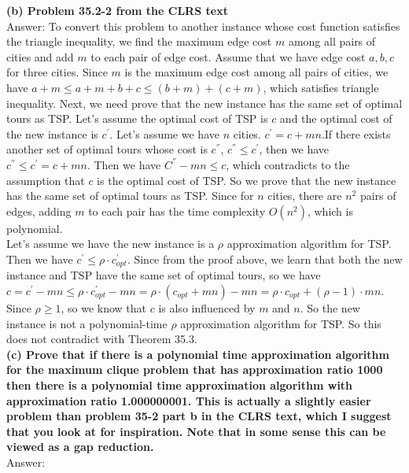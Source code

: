 \documentclass{article}
\begin{document}
\textbf{(b) Problem 35.2-2 from the CLRS text} \\ \newline
Answer: To convert this problem to another instance whose cost function satisfies the triangle inequality, we find the maximum edge cost $m$ among all pairs of cities and add $m$ to each pair of edge cost. Assume that we have edge cost $a, b, c$ for three cities. Since $m$ is the maximum edge cost among all pairs of cities, we have $a + m \leq a + m + b + c \leq (b + m) + (c + m)$, which satisfies triangle inequality. Next, we need prove that the new instance has the same set of optimal tours as TSP. Let's assume the optimal cost of TSP is $c$ and the optimal cost of the new instance is $c^{'}$. Let's assume we have $n$ cities. $c^{'} = c + mn$.If there exists another set of optimal tours whose cost is $c^{''}$, $c^{''}\leq c^{'}$, then we have $c^{''}\leq c^{'} = c + mn$. Then we have $C^{''} - mn \leq c$, which contradicts to the assumption that $c$ is the optimal cost of TSP. So we prove that the new instance has the same set of optimal tours as TSP. Since for $n$ cities, there are $n^2$ pairs of edges, adding $m$ to each pair has the time complexity $O(n^2)$, which is polynomial.\\ \newline
Let's assume we have the new instance is a $\rho$ approximation algorithm for TSP. Then we have $c^{'} \leq \rho \cdot c_{opt}^{'}$. Since from the proof above, we learn that both the new instance and TSP have the same set of optimal tours, so we have $c = c^{'} - mn \leq \rho \cdot c_{opt}^{'} - mn = \rho \cdot (c_{opt} + mn) - mn = \rho \cdot c_{opt} + (\rho - 1)\cdot mn$. Since $\rho \geq 1$, so we know that $c$ is also influenced by $m$ and $n$. So the new instance is not a polynomial-time $\rho$ approximation algorithm for TSP. So this does not contradict with Theorem 35.3.\\ \newline
\textbf{(c) Prove that if there is a polynomial time approximation algorithm for the maximum clique problem that has approximation ratio 1000 then there is a polynomial time approximation algorithm with approximation ratio 1.000000001. This is actually a slightly easier problem than problem 35-2 part b in the CLRS text, which I suggest that you look at for inspiration. Note that in some sense this can be viewed as a gap reduction.}\\ \newline
Answer: 
\end{document}
